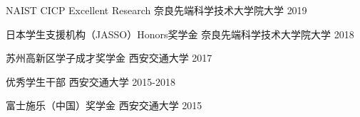 




\begin{cvhonors}





  \cvhonor
    {NAIST CICP Excellent Research} %
    {奈良先端科学技术大学院大学} 
    {}%
    {2019} %
    
  \cvhonor
    {日本学生支援机构（JASSO）Honors奖学金} %
    {奈良先端科学技术大学院大学} 
    {}%
    {2018} %
    
  \cvhonor
    {苏州高新区学子成才奖学金} %
    {西安交通大学} 
    {}%
    {2017} %
    
  \cvhonor
    {优秀学生干部} %
    {西安交通大学} 
    {}%
    {2015-2018} %
    
  \cvhonor
    {富士施乐（中国）奖学金} %
    {西安交通大学} 
    {}%
    {2015} %

    
    
    
\end{cvhonors}



